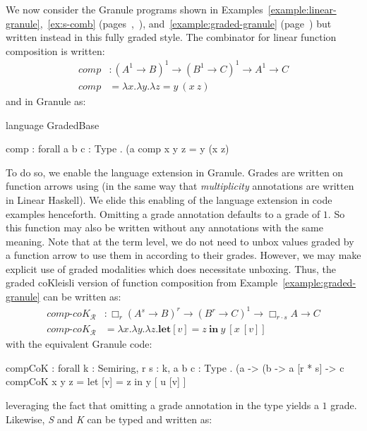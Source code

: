 \begin{example}
We now consider the Granule programs shown in
Examples~\ref{example:linear-granule},~\ref{ex:s-comb} (pages~\pageref{example:linear-granule},~\pageref{k-example}), 
and~\ref{example:graded-granule} (page~\pageref{example:graded-granule}) but written instead in this fully graded style.
The combinator for linear function composition is written: 
\begin{align*}
comp & : (A^1 \rightarrow B)^1 \rightarrow (B^1 \rightarrow C)^1 \rightarrow A^1 \rightarrow C \\
comp & = \lambda x . \lambda y . \lambda z = y\ (x\ z)
\end{align*}
and in Granule as: 
\begin{granule}
language GradedBase 

comp : forall { a b c : Type } . (a %
comp x y z = y (x z)
\end{granule}
To do so, we enable the  language extension in Granule.
Grades are written on function arrows using \granin{\%} (in the same way that
\emph{multiplicity} annotations are written in Linear Haskell). We elide this
enabling of the language extension in code examples henceforth. Omitting a grade
annotation defaults to a grade of $1$. So this function may also be written
without any annotations with the same meaning. Note that at the term level, we
do not need to unbox values graded by a function arrow to use them in according
to their grades. However, we may make explicit use of graded modalities which
does necessitate unboxing. Thus, the graded coKleisli version of function
composition from Example~\ref{example:graded-granule} can be written as:  
\begin{align*}
\textit{comp-}\textit{coK}_{\mathcal{R}} & : \Box_r (A^s \rightarrow B)^r \rightarrow (B^r \rightarrow C)^1 \rightarrow \Box_{r \cdot s} A \rightarrow C \\
\textit{comp-}\textit{coK}_{\mathcal{R}} & = \lambda x . \lambda y . \lambda z . \textbf{let}[v] = z\ \textbf{in}\ y\ [x\ [ v ] ]
\end{align*}
with the equivalent Granule code: 
\begin{granule}
compCoK : forall {k : Semiring, r s : k, a b c : Type} 
     . (a %
     -> (b %
     -> a [r * s] 
     -> c
compCoK x y z = let [v] = z in y  [ u [v] ]
\end{granule}
leveraging the fact that omitting a grade annotation in the type yields a $1$
grade. Likewise, \emph{S} and \emph{K} can be typed and written as: 

\end{example}
